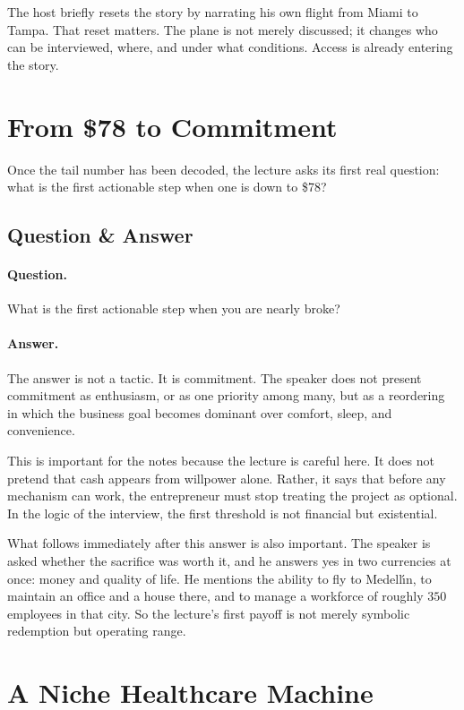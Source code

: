 The host briefly resets the story by narrating his own flight from Miami to Tampa. That reset matters. The plane is not merely discussed; it changes who can be interviewed, where, and under what conditions. Access is already entering the story.

\section{From \$78 to Commitment}

Once the tail number has been decoded, the lecture asks its first real question: what is the first actionable step when one is down to \$78?

\subsection{Question \& Answer}

\paragraph{Question.} What is the first actionable step when you are nearly broke?

\paragraph{Answer.} The answer is not a tactic. It is commitment. The speaker does not present commitment as enthusiasm, or as one priority among many, but as a reordering in which the business goal becomes dominant over comfort, sleep, and convenience.

This is important for the notes because the lecture is careful here. It does not pretend that cash appears from willpower alone. Rather, it says that before any mechanism can work, the entrepreneur must stop treating the project as optional. In the logic of the interview, the first threshold is not financial but existential.

What follows immediately after this answer is also important. The speaker is asked whether the sacrifice was worth it, and he answers yes in two currencies at once: money and quality of life. He mentions the ability to fly to Medell\'{\i}n, to maintain an office and a house there, and to manage a workforce of roughly \(350\) employees in that city. So the lecture’s first payoff is not merely symbolic redemption but operating range.

\section{A Niche Healthcare Machine}

